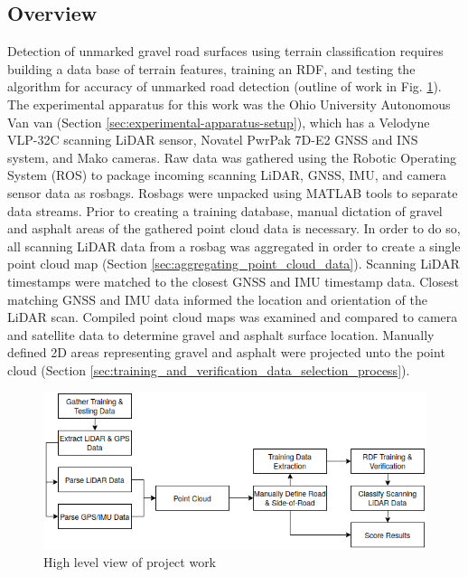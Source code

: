 \documentclass[numbered,pdftex]{ohio-etd}
\begin{document}
{
	
	\subsection{Overview}
	
		{Detection of unmarked gravel road surfaces using terrain classification requires building a data base of terrain features, training an RDF, and testing the algorithm for accuracy of unmarked road detection (outline of work in Fig. \ref{fig:flowz_2}). The experimental apparatus for this work was the Ohio University Autonomous Van van (Section \ref{sec:experimental-apparatus-setup}), which has a Velodyne VLP-32C scanning LiDAR sensor, Novatel PwrPak 7D-E2 GNSS and INS system, and Mako cameras. Raw data was gathered using the Robotic Operating System (ROS) to package incoming scanning LiDAR, GNSS, IMU, and camera sensor data as rosbags. Rosbags were unpacked using MATLAB tools to separate data streams. Prior to creating a training database, manual dictation of gravel and asphalt areas of the gathered point cloud data is necessary. In order to do so, all scanning LiDAR data from a rosbag was aggregated in order to create a single point cloud map (Section \ref{sec:aggregating_point_cloud_data}). Scanning LiDAR timestamps were matched to the closest GNSS and IMU timestamp data. Closest matching GNSS and IMU data informed the location and orientation of the LiDAR scan. Compiled point cloud maps was examined and compared to camera and satellite data to determine gravel and asphalt surface location. Manually defined 2D areas representing gravel and asphalt were projected unto the point cloud (Section \ref{sec:training_and_verification_data_selection_process}).}
		
		\begin{figure}[H]
			\centering
			\includegraphics[width=0.7\linewidth]{Defense_Images/flowz_2}
			\caption[Project Flow]{High level view of project work}
			\label{fig:flowz_2}
		\end{figure}
		
}
\end{document}
